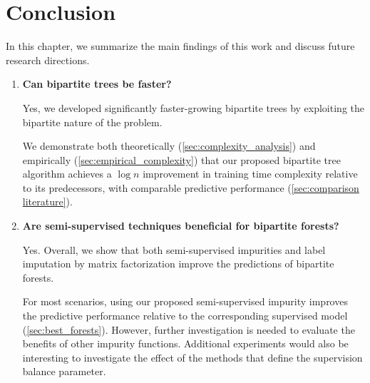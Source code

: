 \chapter{Conclusion}

In this chapter, we summarize the main findings of this work and discuss future research directions.

\begin{enumerate}
    \item \textbf{Can bipartite trees be faster?}

    Yes, we developed significantly faster-growing bipartite trees by exploiting the bipartite nature of the problem.

    We demonstrate both theoretically (\autoref{sec:complexity_analysis}) and empirically (\autoref{sec:empirical_complexity}) that our proposed bipartite tree algorithm achieves a $\log n$ improvement in training time complexity relative to its predecessors, with comparable predictive performance (\autoref{sec:comparison literature}).

    \item \textbf{Are semi-supervised techniques beneficial for bipartite forests?}

    Yes. Overall, we show that both semi-supervised impurities and label imputation by matrix factorization improve the predictions of bipartite forests.%

    For most scenarios, using our proposed semi-supervised impurity improves the predictive performance relative to the corresponding supervised model (\autoref{sec:best_forests}).
    However, further investigation is needed to evaluate the benefits of other impurity functions.
    Additional experiments would also be interesting to investigate the effect of the methods that define the supervision balance parameter.
    

\end{enumerate}
